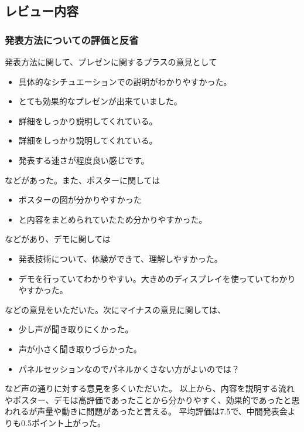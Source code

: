 \documentclass[openany,11pt,papersize]{jsbook}
\begin{document}
\subsection{レビュー内容}

\subsubsection{発表方法についての評価と反省}
発表方法に関して、プレゼンに関するプラスの意見として
\begin{itemize}

\item 具体的なシチュエーションでの説明がわかりやすかった。
\item とても効果的なプレゼンが出来ていました。
\item 詳細をしっかり説明してくれている。
\item 詳細をしっかり説明してくれている。
\item 発表する速さが程度良い感じです。

\end{itemize}

などがあった。また、ポスターに関しては
\begin{itemize}

\item ポスターの図が分かりやすかった
\item と内容をまとめられていたため分かりやすかった。

\end{itemize}

などがあり、デモに関しては
\begin{itemize}

\item 発表技術について、体験ができて、理解しやすかった。
\item デモを行っていてわかりやすい。大きめのディスプレイを使っていてわかりやすかった。

\end{itemize}

などの意見をいただいた。次にマイナスの意見に関しては、
\begin{itemize}

\item 少し声が聞き取りにくかった。
\item 声が小さく聞き取りづらかった。
\item パネルセッションなのでパネルかくさない方がよいのでは？

\end{itemize}
など声の通りに対する意見を多くいただいた。
以上から、内容を説明する流れやポスター、デモは高評価であったことから分かりやすく、効果的であったと思われるが声量や動きに問題があったと言える。
平均評価は7.5で、中間発表会よりも0.5ポイント上がった。
\end{document}
